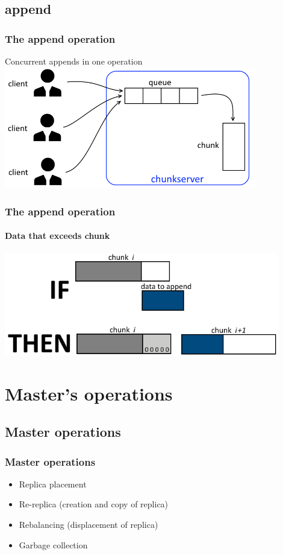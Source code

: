 \documentclass{beamer}
\newcommand{\slidewidth}{12cm}
\begin{document}
\subsection{append}
\begin{frame}
 \frametitle{The append operation}
 Concurrent appends in \alert{one} operation\\\vspace{0.5cm}
 \centering
 \includegraphics[width=11cm]{figures/appendsschema.png}
\end{frame}

\begin{frame}
 \frametitle{The append operation}
 \framesubtitle{Data that exceeds chunk}
 \centering
 \includegraphics[width=\slidewidth]{figures/appends2schema.png}
\end{frame}

\section{Master's operations}
\subsection{Master operations}

\begin{frame}
 \frametitle{Master operations}
 \begin{itemize}
  \item \alert{Replica placement}
  \item \alert{Re-replica} (creation and copy of replica)
  \item \alert{Rebalancing} (displacement of replica)
  \item \alert{Garbage collection}
 \end{itemize}
\end{frame}
\end{document}

